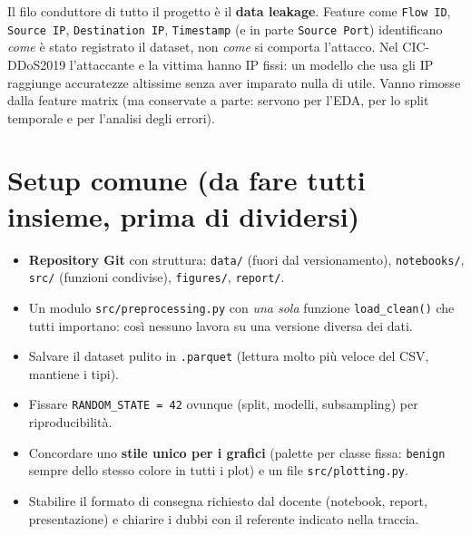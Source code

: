 \begin{attenzione}
Il filo conduttore di tutto il progetto è il \textbf{data leakage}. Feature come
\texttt{Flow ID}, \texttt{Source IP}, \texttt{Destination IP},
\texttt{Timestamp} (e in parte \texttt{Source Port}) identificano \emph{come} è
stato registrato il dataset, non \emph{come} si comporta l'attacco. Nel
CIC-DDoS2019 l'attaccante e la vittima hanno IP fissi: un modello che usa gli IP
raggiunge accuratezze altissime senza aver imparato nulla di utile. Vanno
rimosse dalla feature matrix (ma conservate a parte: servono per l'EDA, per lo
split temporale e per l'analisi degli errori).
\end{attenzione}

\section{Setup comune (da fare tutti insieme, prima di dividersi)}

\begin{strategia}
\begin{itemize}
  \item \textbf{Repository Git} con struttura:
        \texttt{data/} (fuori dal versionamento), \texttt{notebooks/},
        \texttt{src/} (funzioni condivise), \texttt{figures/}, \texttt{report/}.
  \item Un modulo \texttt{src/preprocessing.py} con \emph{una sola} funzione
        \texttt{load\_clean()} che tutti importano: così nessuno lavora su una
        versione diversa dei dati.
  \item Salvare il dataset pulito in \texttt{.parquet} (lettura molto più
        veloce del CSV, mantiene i tipi).
  \item Fissare \texttt{RANDOM\_STATE = 42} ovunque (split, modelli,
        subsampling) per riproducibilità.
  \item Concordare uno \textbf{stile unico per i grafici} (palette per classe
        fissa: \texttt{benign} sempre dello stesso colore in tutti i plot) e un
        file \texttt{src/plotting.py}.
  \item Stabilire il formato di consegna richiesto dal docente (notebook,
        report, presentazione) e chiarire i dubbi con il referente indicato
        nella traccia.
\end{itemize}
\end{strategia}

